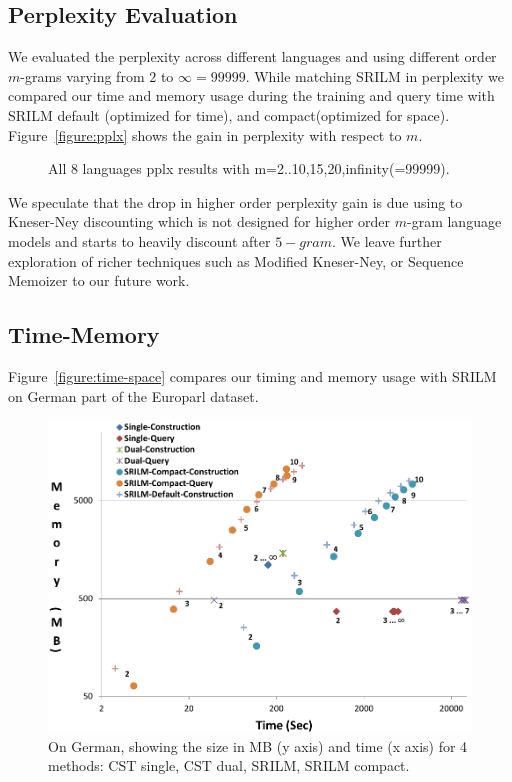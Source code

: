 \subsection{Perplexity Evaluation}
We evaluated the perplexity across different languages and using different order $m$-grams varying from $2$ to $\infty=99999$. While matching SRILM in perplexity we compared our time and memory usage during the training and query time with SRILM default (optimized for time), and compact(optimized for space). Figure~\ref{figure:pplx} shows the gain in perplexity with respect to $m$. 
\begin{figure}

\caption{All 8 languages pplx results with m=2..10,15,20,infinity(=99999).}
\end{figure}\label{figure:pplx}
We speculate that the drop in higher order perplexity gain is due using to Kneser-Ney discounting which is not designed for higher order $m$-gram language models and starts to heavily discount after $5-gram$. We leave further exploration of richer techniques such as Modified Kneser-Ney, or Sequence Memoizer to our future work. 
\subsection{Time-Memory}
Figure~\ref{figure:time-space} compares our timing and memory usage with SRILM on German part of the Europarl dataset. 

\begin{figure}
\includegraphics[width=\columnwidth]{figures/Time-Space.pdf}
\caption{On German, showing the size in MB (y axis) and time (x axis) for 4 methods: CST single, CST dual, SRILM, SRILM compact.}
\end{figure}\label{figure:time-space}

